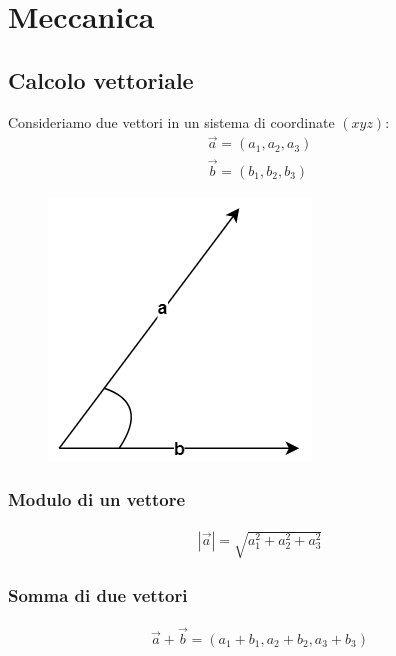 \chapter{Meccanica}

\section{Calcolo vettoriale}
Consideriamo due vettori in un sistema di coordinate $(xyz)$:
\begin{displaymath}\begin{aligned}
	\vec{a} = (a_1, a_2, a_3)\\
    \vec{b} = (b_1, b_2, b_3)    
\end{aligned}\end{displaymath}
\begin{figure}[h!]
       	\centering
        \includegraphics[scale = 0.4]{vettori.png}
    \end{figure}
    
\subsection{Modulo di un vettore}
\begin{displaymath}\begin{aligned}
	|\vec{a}| = \sqrt{a_1^2 + a_2^2 + a_3^2}
\end{aligned}\end{displaymath}

\subsection{Somma di due vettori}
\begin{displaymath}\begin{aligned}
	\vec{a} + \vec{b} = (a_1 + b_1, a_2 + b_2, a_3 + b_3)
\end{aligned}\end{displaymath}

